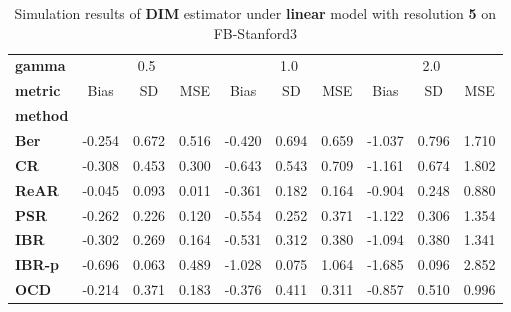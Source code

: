 \begin{table}
\centering
\caption{Simulation results of \textbf{DIM} estimator under \textbf{linear} model with resolution \textbf{5} on FB-Stanford3}
\begin{tabular}{lccccccccc}
\toprule
\textbf{gamma} & \multicolumn{3}{c}{0.5} & \multicolumn{3}{c}{1.0} & \multicolumn{3}{c}{2.0} \\
\textbf{metric} &   Bias &     SD &    MSE &   Bias &     SD &    MSE &   Bias &     SD &    MSE \\
\textbf{method} &        &        &        &        &        &        &        &        &        \\
\midrule
\textbf{Ber} & -0.254 &  0.672 &  0.516 & -0.420 &  0.694 &  0.659 & -1.037 &  0.796 &  1.710 \\
\textbf{CR} & -0.308 &  0.453 &  0.300 & -0.643 &  0.543 &  0.709 & -1.161 &  0.674 &  1.802 \\
\textbf{ReAR} & -0.045 &  0.093 &  0.011 & -0.361 &  0.182 &  0.164 & -0.904 &  0.248 &  0.880 \\
\textbf{PSR} & -0.262 &  0.226 &  0.120 & -0.554 &  0.252 &  0.371 & -1.122 &  0.306 &  1.354 \\
\textbf{IBR} & -0.302 &  0.269 &  0.164 & -0.531 &  0.312 &  0.380 & -1.094 &  0.380 &  1.341 \\
\textbf{IBR-p} & -0.696 &  0.063 &  0.489 & -1.028 &  0.075 &  1.064 & -1.685 &  0.096 &  2.852 \\
\textbf{OCD} & -0.214 &  0.371 &  0.183 & -0.376 &  0.411 &  0.311 & -0.857 &  0.510 &  0.996 \\
\bottomrule
\end{tabular}
\end{table}
